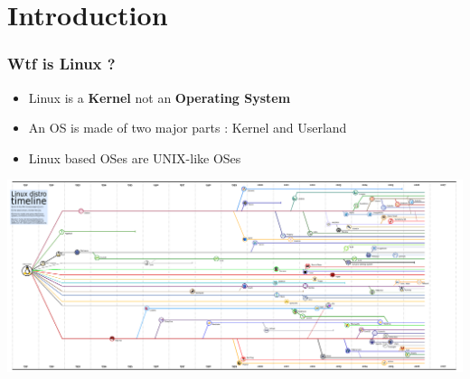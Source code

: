\section*{Introduction}

\begin{frame}
    \frametitle{Wtf is Linux ?}
        \begin{itemize}
            \item Linux is a \textbf{Kernel} not an \textbf{Operating System}
	    \item An OS is made of two major parts : Kernel and Userland
            \item Linux based OSes are UNIX-like OSes
        \end{itemize}
\end{frame}

\begin{frame}
        \begin{center}
            \includegraphics[width=\linewidth, height=\textheight, keepaspectratio]{linux_timeline.png}
        \end{center}
\end{frame}
